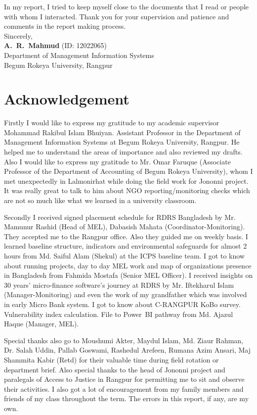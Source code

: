 \documentclass[12pt,a4paper]{report}
\begin{document}
In my report, I tried to keep myself close to the documents that I read or people with whom I interacted. Thank you for your supervision and patience and comments in the report making process.\\[6pt]
Sincerely,\\
\textbf{A.~R.~Mahmud} \quad (ID: 12022065)\\
Department of Management Information Systems\\
Begum Rokeya University, Rangpur

\chapter*{Acknowledgement}
\enlargethispage{2\baselineskip}
Firstly I would like to express my gratitude to my academic supervisor Mohammad Rakibul Islam Bhuiyan. Assistant Professor in the Department of Management Information Systems at Begum Rokeya University, Rangpur. He helped me to understand the areas of importance and also reviewed my drafts. Also I would like to express my gratitude to Mr. Omar Faruque (Associate Professor of the Department of Accounting of Begum Rokeya University), whom I met unexpectedly in Lalmonirhat while doing the field work for Jononni project. It was really great to talk to him about NGO reporting/monitoring checks which are not so much like what we learned in a university classroom.

Secondly I received signed placement schedule for RDRS Bangladesh by Mr. Mamunur Rashid (Head of MEL), Dabasish Mahata (Coordinator-Monitoring). They accepted me to the Rangpur office. Also they guided me on weekly basis. I learned baseline structure, indicators and environmental safeguards for almost 2 hours from Md. Saiful Alam (Shekul) at the ICPS baseline team. I got to know about running projects, day to day MEL work and map of organizations presence in Bangladesh from Fahmida Mostafa (Senior MEL Officer). I received insights on 30 years' micro-finance software's journey at RDRS by Mr. Iftekharul Islam (Manager-Monitoring) and even the work of my grandfather which was involved in early Micro Bank system. I got to know about C-RANGPUR KoBo survey. Vulnerability index calculation. File to Power~BI pathway from Md. Ajazul Haque (Manager, MEL).

Special thanks also go to Moushumi Akter, Maydul Islam, Md. Ziaur Rahman, Dr. Salah Uddin, Pallab Goswami, Rashedul Arefeen, Rumana Azim Ansari, Maj Shammita Kabir (Retd) for their valuable time during field rotation or department brief. Also special thanks to the head of Jononni project and paralegals of Access to Justice in Rangpur for permitting me to sit and observe their activities. I also got a lot of encouragement from my family members and friends of my class throughout the term. The errors in this report, if any, are my own.
\end{document}

